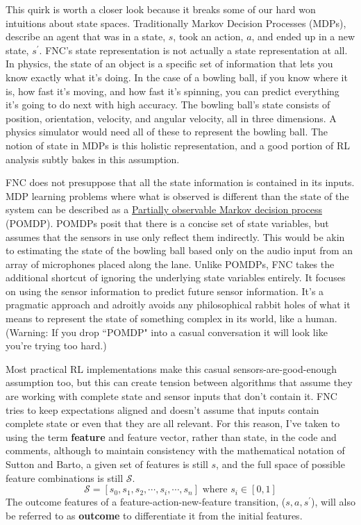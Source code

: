 This quirk is worth a closer look because it breaks some of
our hard won intuitions about state spaces.
Traditionally Markov Decision Processes (MDPs), describe an agent that
was in a state, $s$, took an action, $a$, and ended up in a new state,
$s^\prime$. 
FNC's state representation
is not actually a state representation at all. 
In physics, the state of an object is a specific set of information that
lets you know exactly what it's doing. In the case of a bowling ball,
if you know where it is, how fast it's moving, and how fast it's spinning,
you can predict everything it's going to do next with high accuracy.
The bowling ball's state consists of position, orientation, velocity,
and angular velocity, all in three dimensions. A physics simulator would
need all of these to represent the bowling ball. The notion of state in
MDPs is this holistic representation, and a good portion of RL analysis
subtly bakes in this assumption. 

FNC does not presuppose that all the state information is contained
in its inputs. MDP learning problems where what is observed is different
than the state of the system can be described as a
\href{https://en.wikipedia.org/wiki/Partially_observable_Markov_decision_process}{Partially observable Markov decision process}
(POMDP). POMDPs posit that there is a concise set of state variables,
but assumes that the sensors in use only reflect them indirectly.
This would be akin to estimating the state of the bowling ball based
only on the audio input from an array of microphones placed along the lane.
Unlike POMDPs, FNC takes the additional shortcut of ignoring the
underlying state variables entirely. It focuses on using the sensor
information to predict future sensor information. It's a pragmatic approach
and adroitly avoids any philosophical rabbit holes of what it means
to represent the state of something complex in its world, like a human.
(Warning: If you drop ``POMDP" into a casual conversation
it will look like you're trying too hard.)

Most practical RL implementations make this casual
sensors-are-good-enough assumption too, but this
can create tension between algorithms that assume they are working with
complete state and sensor inputs that don't contain it. FNC tries to keep
expectations aligned and doesn't assume that inputs contain complete state
or even that they are all relevant. For this reason, I've taken to using
the term \textbf{feature} and feature vector, rather than state, in the code
and comments, although to maintain consistency with the mathematical
notation of Sutton and Barto, a given set of features is still $s$, and
the full space of possible feature combinations is still $\mathcal{S}$.
\begin{equation}
\mathcal{S} = [s_0, s_1, s_2, \cdots, s_i, \cdots, s_n]
\mbox{ where } s_i \in [0, 1] 
\end{equation}
The outcome features of a feature-action-new-feature transition,
($s, a, s^\prime$), will also be referred to as \textbf{outcome}
to differentiate it from the initial features. 

